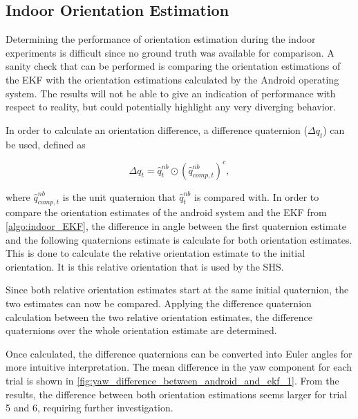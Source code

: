 \subsection{Indoor Orientation Estimation}
\label{sec-results-Indoor orientation_estimation}
Determining the performance of orientation estimation during the indoor experiments is difficult since no ground truth was available for comparison. A sanity check that can be performed is comparing the orientation estimations of the EKF with the orientation estimations calculated by the Android operating system. The results will not be able to give an indication of performance with respect to reality, but could potentially highlight any very diverging behavior. \par 

In order to calculate an orientation difference, a difference quaternion ($	\Delta q_t$) can be used, defined as \cite{Kok2017}

\begin{equation}
	\Delta q_t = \hat{q}_{t}^{nb} \odot \left( \hat{q}_{comp,t}^{nb}  \right)^c,
\end{equation} 

where $\hat{q}_{comp,t}^{nb}$ is the unit quaternion that $ \hat{q}_{t}^{nb} $ is compared with.  In order to compare the orientation estimates of the android system and the EKF from \cref{algo:indoor_EKF}, the difference in angle between the first quaternion estimate and the following quaternions estimate is calculate for both orientation estimates. This is done to calculate the relative orientation estimate to the initial orientation. It is this relative orientation that is used by the \ac{SHS}.\par 

Since both relative orientation estimates start at the same initial quaternion, the two estimates can now be compared. Applying the difference quaternion calculation between the two relative orientation estimates, the difference quaternions over the whole orientation estimate are determined.  \par 

Once calculated, the difference quaternions can be converted into Euler angles for more intuitive interpretation. The mean difference in the yaw component for each trial is shown in  \cref{fig:yaw_difference_between_android_and_ekf_1}. From the results, the difference between both orientation estimations seems larger for trial 5 and 6, requiring further investigation.

